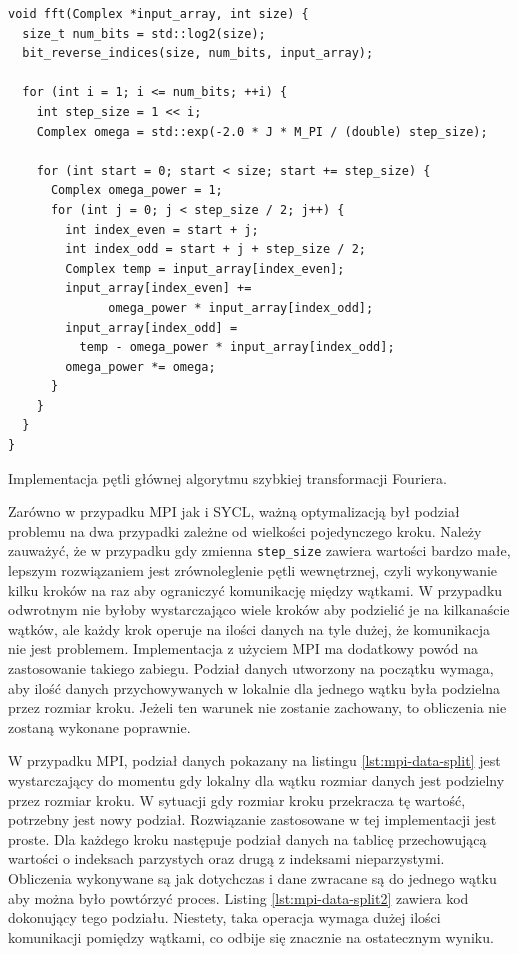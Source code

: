 \documentclass[a4paper,12pt]{book} %
\begin{document}
\begin{lstfloat}
\lstset{language=C++}
\begin{lstlisting}[frame=single]
void fft(Complex *input_array, int size) {
  size_t num_bits = std::log2(size);
  bit_reverse_indices(size, num_bits, input_array);

  for (int i = 1; i <= num_bits; ++i) {
    int step_size = 1 << i;
    Complex omega = std::exp(-2.0 * J * M_PI / (double) step_size);

    for (int start = 0; start < size; start += step_size) {
      Complex omega_power = 1;
      for (int j = 0; j < step_size / 2; j++) {
        int index_even = start + j;
        int index_odd = start + j + step_size / 2;
        Complex temp = input_array[index_even];
        input_array[index_even] += 
        	  omega_power * input_array[index_odd];
        input_array[index_odd] = 
          temp - omega_power * input_array[index_odd];
        omega_power *= omega;
      }
    }
  }
}

\end{lstlisting}
\caption{Implementacja pętli głównej algorytmu szybkiej transformacji Fouriera.}
\label{lst:fft-seq}
\end{lstfloat}

Zarówno w przypadku MPI jak i SYCL, ważną optymalizacją był podział problemu na dwa przypadki zależne od wielkości pojedynczego kroku. Należy zauważyć, że w przypadku gdy zmienna \texttt{step\_size} zawiera wartości bardzo małe, lepszym rozwiązaniem jest zrównoleglenie pętli wewnętrznej, czyli wykonywanie kilku kroków na raz aby ograniczyć komunikację między wątkami. W przypadku odwrotnym nie byłoby wystarczająco wiele kroków aby podzielić je na kilkanaście wątków, ale każdy krok operuje na ilości danych na tyle dużej, że komunikacja nie jest problemem. Implementacja z użyciem MPI ma dodatkowy powód na zastosowanie takiego zabiegu. Podział danych utworzony na początku wymaga, aby ilość danych przychowywanych w lokalnie dla jednego wątku była podzielna przez rozmiar kroku. Jeżeli ten warunek nie zostanie zachowany, to obliczenia nie zostaną wykonane poprawnie.

W przypadku MPI, podział danych pokazany na listingu \ref{lst:mpi-data-split} jest wystarczający do momentu gdy lokalny dla wątku rozmiar danych jest podzielny przez rozmiar kroku. W sytuacji gdy rozmiar kroku przekracza tę wartość, potrzebny jest nowy podział. Rozwiązanie zastosowane w tej implementacji jest proste. Dla każdego kroku następuje podział danych na tablicę przechowującą wartości o indeksach  parzystych oraz drugą z indeksami nieparzystymi. Obliczenia wykonywane są jak dotychczas i dane zwracane są do jednego wątku aby można było powtórzyć proces. Listing \ref{lst:mpi-data-split2} zawiera kod dokonujący tego podziału. Niestety, taka operacja wymaga dużej ilości komunikacji pomiędzy wątkami, co odbije się znacznie na ostatecznym wyniku.
\end{document}
